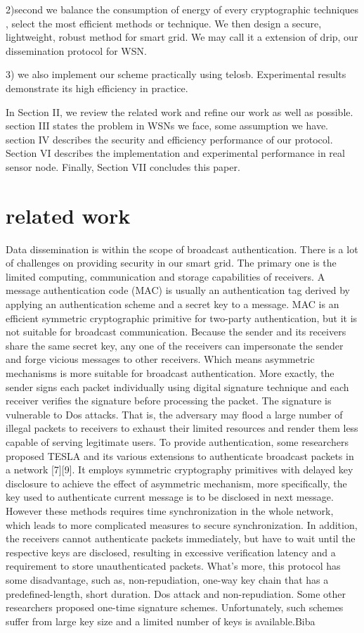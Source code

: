 \documentclass[lnicst,sechang,a4paper]{svmultln}
\begin{document}
2)second we balance the consumption of energy of every cryptographic techniques , select the most efficient methods or technique. We then design a secure, lightweight, robust method for smart grid. We may call it a extension of drip, our dissemination protocol for WSN.

3) we also implement our scheme practically using telosb. Experimental results demonstrate its high efficiency in practice.

In Section II, we review the related work and refine our work as well as possible. section III states the problem in WSNs we face, some assumption we have. section IV describes the security and efficiency performance of our protocol. Section VI describes the implementation and experimental performance in real sensor node. Finally, Section VII concludes this paper. 

\section{related work}
Data dissemination is within the scope of broadcast authentication.
There is a lot of challenges on providing security in our smart grid. The primary one is the limited computing, communication and storage capabilities of receivers. A message authentication code (MAC) is usually an authentication tag derived by applying an authentication scheme and a secret key to a  message.
MAC is an efficient symmetric cryptographic primitive for two-party authentication, but it is not suitable for broadcast communication. Because the sender and its receivers share the same secret key, any one of the receivers can impersonate the sender and forge vicious messages to other receivers. Which means asymmetric mechanisms is more suitable for broadcast authentication. More exactly, the sender signs each packet individually using digital signature technique and each receiver verifies the signature before processing the packet. The signature is vulnerable to Dos attacks. That is, the adversary may flood a large number of illegal packets to receivers to exhaust their limited resources and render them less capable of serving legitimate users. To provide authentication, some researchers proposed TESLA and its various extensions to authenticate broadcast packets in a network [7][9]. It employs symmetric cryptography primitives with delayed key disclosure to achieve the effect of asymmetric mechanism, more specifically, the key used to authenticate current message is to be disclosed in next  message. However these methods requires time synchronization in the whole network, which leads to more complicated measures to secure synchronization. In addition, the receivers cannot authenticate packets immediately, but have to wait until the respective keys are disclosed, resulting in excessive verification latency and a requirement to store unauthenticated packets. What's more, this protocol has some disadvantage, such as, non-repudiation, one-way key chain that has a predefined-length, short duration.   Dos attack
\cite{a} and non-repudiation. Some other researchers proposed one-time signature schemes. Unfortunately, such schemes suffer from large key size and a limited number of keys is available.{Biba}
\end{document}
